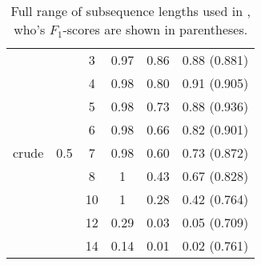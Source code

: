\begin{table}
\begin{tabular}{| c | c | c | c | c | c | }
		
		&& 3 & 0.97 & 0.86 &  0.88  (0.881)  \\ 
		&& 4 & 0.98 & 0.80 & 0.91  (0.905)   \\ 
		 && 5 & 0.98 & 0.73 &  0.88 (0.936)   \\ 
		&& 6 & 0.98 & 0.66 &  0.82  (0.901)  \\
		crude&0.5& 7 & 0.98 & 0.60 &  0.73 (0.872)  \\
		&& 8 & 1 & 0.43 &  0.67   (0.828) \\ 
		&& 10 & 1 & 0.28 &  0.42   (0.764) \\ 
		&& 12 & 0.29 & 0.03 &  0.05   (0.709) \\ 
		&& 14 & 0.14 & 0.01 &  0.02   (0.761) \\ \hline 
		
		
		
	\end{tabular}




	\caption{Full range of subsequence lengths used in \cite{lodhi}, who's  $ F_1 $-scores are shown in parentheses.  \label{tab:appendix_ssk_n}}
\end{table} %




